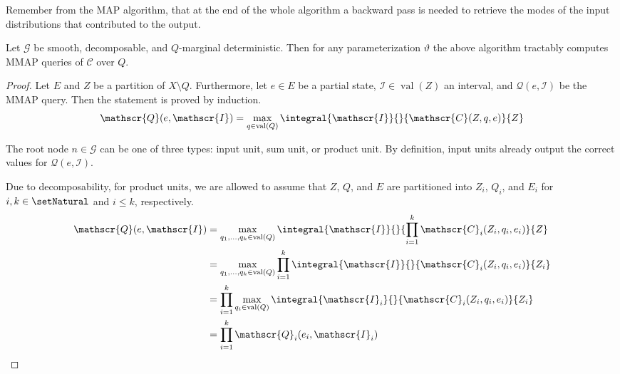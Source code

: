 \documentclass[9pt,fleqn,twoside,twocolumn]{stdglobal}
\DeclareMathOperator{\val}{val}
\begin{document}
  \noindent
  Remember from the MAP algorithm, that at the end of the whole algorithm a backward pass is needed to retrieve the modes of the input distributions that contributed to the output.

  \begin{theorem*}
    Let $\mathscr{G}$ be smooth, decomposable, and $Q$-marginal deterministic.
    Then for any parameterization $ϑ$ the above algorithm
    tractably computes MMAP queries of $\mathscr{C}$ over $Q$.
  \end{theorem*}
  \begin{proof}
    Let $E$ and $Z$ be a partition of $X\setminus Q$.
    Furthermore, let $e\in E$ be a partial state, $\mathscr{I}\in\val(Z)$ an interval, and $\mathscr{Q}(e,\mathscr{I})$ be the MMAP query.
    Then the statement is proved by induction.
    \[
      \mathscr{Q}(e,\mathscr{I}) = \max_{q\in\val(Q)} \integral{\mathscr{I}}{}{\mathscr{C}(Z,q,e)}{Z}
    \]

    The root node $n\in\mathscr{G}$ can be one of three types: input unit, sum unit, or product unit.
    By definition, input units already output the correct values for $\mathscr{Q}(e,\mathscr{I})$.

    Due to decomposability, for product units, we are allowed to assume that $Z$, $Q$, and $E$ are partitioned into $Z_i$, $Q_i$, and $E_i$ for $i,k\in\setNatural$ and $i\leq k$, respectively.
    \begin{align*}
      \mathscr{Q}(e,\mathscr{I}) &= \max_{q_1,\ldots,q_k\in\val(Q)} \integral{\mathscr{I}}{}{\prod_{i=1}^k\mathscr{C}_i(Z_i,q_i,e_i)}{Z} \\
      &= \max_{q_1,\ldots,q_k\in\val(Q)} \prod_{i=1}^k \integral{\mathscr{I}}{}{\mathscr{C}_i(Z_i,q_i,e_i)}{Z_i} \\
      &= \prod_{i=1}^k \max_{q_i\in\val(Q)} \integral{\mathscr{I}_i}{}{\mathscr{C}_i(Z_i,q_i,e_i)}{Z_i} \\
      &= \prod_{i=1}^k \mathscr{Q}_i(e_i,\mathscr{I}_i)
    \end{align*}


\end{proof}
\end{document}

